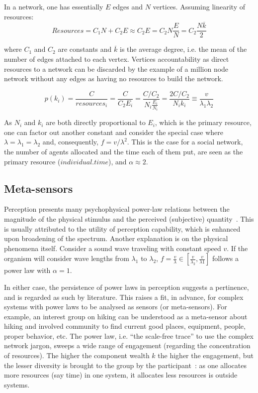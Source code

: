 \documentclass[a4paper, 11pt]{article} %
\begin{document}
In a network, one has essentially $E$ edges and $N$ vertices.
Assuming linearity of resources:
\begin{equation}\label{eq:nre}
	Resources=C_1 N + C_2 E \approx C_2 E = C_2 N \frac{E}{N} = C_2 \frac{N \overline{k}}{2}
\end{equation}

\noindent where $C_1$ and $C_2$ are constants and $\overline{k}$ is
the average degree, i.e. the mean of the number of edges attached to each vertex.
Vertices accountability as direct resources to a network can be
discarded by the example of a million node network without
any edges as having no resources to build the network.

\begin{equation}\label{eq:eqf}
	p(k_i)=\frac{C}{resources_i}=\frac{C}{C_2 E_i}=\frac{C/C_2}{N_i \frac{E_i}{N_i}}=\frac{2C/C_2}{N_i k_i} \equiv \frac{v}{\lambda_1   \lambda_2}
\end{equation}

As $N_i$ and $k_i$ are both directly proportional to $E_i$, which is the primary resource, one can factor out another constant and consider the special case where $\lambda=\lambda_1=\lambda_2$ and, consequently, $f=v/\lambda^2$. This is the case for a social network, the number of agents allocated and the time each of them put, are seen as the primary resource ($individual . time$), and $\alpha\approx 2$.

\subsection{Meta-sensors}
Perception presents many psychophysical power-law 
relations between the
magnitude of the physical stimulus and the perceived 
(subjective) quantity~\cite{pbook}.
This is usually attributed to the utility of perception capability,
which is enhanced upon broadening of the spectrum.
Another explanation is on the physical phenomena itself.
Consider a sound wave traveling with constant speed $v$.
If the organism will consider wave lengths from $\lambda_1$
to $\lambda_2$, $f=\frac{v}{\lambda} \in [\frac{v}{\lambda_2},\frac{v}{\lambda1}]$ follows
a power law with $\alpha=1$.

In either case, the persistence of power laws in perception
suggests a pertinence, and is regarded as such by literature.
This raises
a fit, in advance, for complex systems with power laws
to be analysed as sensors (or meta-sensors).
For example, an interest group on hiking can be understood as
a meta-sensor about hiking and involved community to find current good
places, equipment, people, proper behavior, etc.
The power law, i.e. ``the scale-free trace'' to use
the complex network jargon, sweeps a wide
range of engagement (regarding the concentration of resources).
The higher the component wealth $k$ the higher the engagement,
but the lesser diversity is brought to the group
by the participant~\cite{tStable}: 
as one allocates more resources (say time)
in one system,
it allocates less resources is outside systems.
\end{document}
